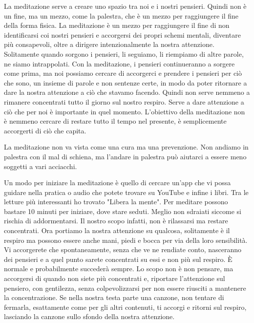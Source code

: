 \documentclass[12pt]{book} %
\begin{document}
La meditazione serve a creare uno spazio tra noi e i nostri pensieri. 
Quindi non è un fine, ma un mezzo, come la palestra, che è un mezzo per raggiungere il fine della forma fisica. La meditazione
è un mezzo per raggiungere il fine di non identificarsi coi nostri pensieri e accorgersi dei propri schemi mentali,
diventare più consapevoli, oltre a dirigere intenzionalmente la nostra attenzione. Solitamente quando sorgono i
pensieri, li seguiamo, li riempiamo di altre parole, ne siamo intrappolati. Con la
meditazione, i pensieri continueranno a sorgere come prima, ma noi possiamo cercare di accorgerci e prendere i pensieri per
ciò che sono, un insieme di parole e non sentenze certe, in modo da poter ritornare a dare la nostra attenzione a ciò che
stavamo facendo. Quindi non serve nemmeno a rimanere concentrati tutto il giorno sul nostro respiro. 
Serve a dare attenzione a ciò che per noi è importante in quel momento. L'obiettivo della meditazione non è
nemmeno cercare di restare tutto il tempo nel presente, è semplicemente accorgerti di ciò che capita.

La meditazione non va vista come una cura ma una prevenzione. Non andiamo in palestra con il mal di schiena, ma l'andare in palestra può aiutarci a essere meno soggetti a vari acciacchi.

Un modo per iniziare la meditazione è quello di cercare un'app che vi possa guidare nella pratica o audio che potete trovare su YouTube e infine i libri. Tra le letture più interessanti ho trovato "Libera la mente". 
Per meditare possono bastare 10 minuti per iniziare, dove stare seduti. Meglio non sdraiati siccome si rischia di addormentarsi.
Il nostro scopo infatti, non è rilassarsi ma restare concentrati. Ora portiamo la nostra attenzione su qualcosa, solitamente è il respiro ma possono essere anche mani, piedi e bocca per via della loro sensibilità. 
Vi accorgerete che spontaneamente, senza che ve ne rendiate conto, nasceranno dei pensieri e a quel punto
sarete concentrati su essi e non più sul respiro. È normale e probabilmente succederà sempre. Lo
scopo non è non pensare, ma accorgersi di quando non siete più concentrati e, riportare l'attenzione sul pensiero, con gentilezza, senza colpevolizzarsi per non essere riusciti a mantenere la concentrazione. Se nella nostra testa parte una canzone, non tentare di fermarla, esattamente come per gli altri contenuti, ti accorgi e ritorni sul respiro, lasciando la canzone sullo sfondo della nostra attenzione.
\end{document}
